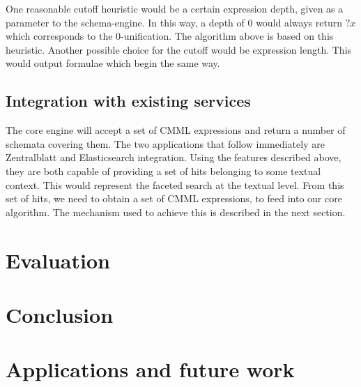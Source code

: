 \documentclass[a4paper,11pt,oneside]{article}
\begin{document}
One reasonable cutoff heuristic would be a certain expression depth, given as a
parameter to the schema-engine.  In this way, a depth of 0 would always return
$?x$ which corresponds to the 0-unification. The algorithm above is based on
this heuristic.  Another possible choice for the cutoff would be expression
length.  This would output formulae which begin the same way.

\subsection{Integration with existing services}
The core engine will accept a set of CMML expressions and return a number of
schemata covering them.  The two applications that follow immediately are
Zentralblatt and Elasticsearch integration.  Using the features described
above, they are both capable of providing a set of hits belonging to some
textual context. This would represent the faceted search at the textual level.
From this set of hits, we need to obtain a set of CMML expressions, to feed
into our core algorithm. The mechanism used to achieve this is described in the
next section.

\section{Evaluation}\label{sec:evaluation}

\section{Conclusion}\label{sec:conclusion}

\section{Applications and future work}\label{sec:future}

\printbibliography
\end{document}
